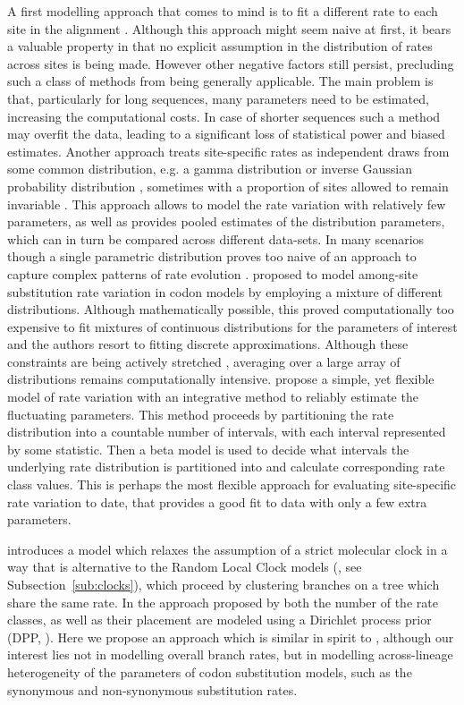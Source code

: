 A first modelling approach that comes to mind is to fit a different rate to each site in the alignment \citep{Nielsen1997}.
Although this approach might seem naive at first, it bears a valuable property in that no explicit assumption in the distribution of rates across sites is being made.
However other negative factors still persist, precluding such a class of methods from being generally applicable.
The main problem is that, particularly for long sequences, many parameters need to be estimated, increasing the computational costs.
In case of shorter sequences such a method may overfit the data, leading to a significant loss of statistical power and biased estimates.
Another approach treats site-specific rates as independent draws from some common distribution, e.g. a gamma distribution \citep{Yang1993} or inverse Gaussian probability distribution \citep{Waddell1997}, sometimes with a proportion of sites allowed to remain invariable \citep{Gu1995}.
This approach allows to model the rate variation with relatively few parameters, as well as provides pooled estimates of the distribution parameters, which can in turn be compared across different data-sets.  
In many scenarios though a single parametric distribution proves too naive of an approach to capture complex patterns of rate evolution \citep{Pond2005a}.
\cite{Yang2000} proposed to model among-site substitution rate variation in codon models by employing a mixture of different distributions.
Although mathematically possible, this proved computationally too expensive to fit mixtures of continuous distributions for the parameters of interest and the authors resort to fitting discrete approximations.
Although these constraints are being actively stretched \citep{Suchard2009,Ayres2012}, averaging over a large array of distributions remains computationally intensive. 
\citet{Pond2005a} propose a simple, yet flexible model of rate variation with an integrative method to reliably estimate the fluctuating parameters.
This method proceeds by partitioning the rate distribution into a countable number of intervals, with each interval represented by some statistic.
Then a beta model is used to decide what intervals the underlying rate distribution is partitioned into and calculate corresponding rate class values.
This is perhaps the most flexible approach for evaluating site-specific rate variation to date, that provides a good fit to data with only a few extra parameters.

\cite{Heath2012} introduces a model which relaxes the assumption of a strict molecular clock in a way that is alternative to the Random Local Clock models (\cite{Drummond2010}, see Subsection~\ref{sub:clocks}), which proceed by clustering branches on a tree which share the same rate.
In the approach proposed by \cite{Heath2012} both the number of the rate classes, as well as their placement are modeled using a Dirichlet process prior (DPP, \cite{Ferguson1973}). %
Here we propose an approach which is similar in spirit to \cite{Heath2012}, although our interest lies not in modelling overall branch rates, but in modelling across-lineage heterogeneity of the parameters of codon substitution models, such as the synonymous and non-synonymous substitution rates.

